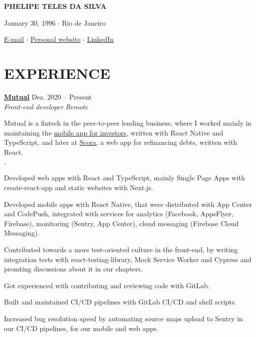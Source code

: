 \documentclass[12pt]{article}
\newenvironment{tightlist}
  {\begin{list}
    {$\cdot$}
    {
      \setlength{\leftmargin}{0em}
      \setlength{\itemsep}{\smallskipamount}
    }
  }
{\end{list}}
\begin{document}
\pagestyle{empty}

\centerline{\huge\bf PHELIPE TELES DA SILVA}
\medskip

\centerline{January 30, 1996 $\cdot$ Rio de Janeiro}
\smallskip

\centerline{
  \href{mailto:telesphelipe@gmail.com}{E-mail}
  $\cdot$
  \href{https://phelipetls.github.io}{Personal website}
  $\cdot$
  \href{https://linkedin.com/in/phelipeteles}{LinkedIn}
}
\smallskip

\section*{EXPERIENCE}

\textbf{\href{https://mutual.club}{Mutual}} \hfill Dez. 2020 -- Present \\
\textit{Front-end developer} \hfill \textit{Remote} {\parfillskip=0pt\par}

Mutual is a fintech in the peer-to-peer lending business, where I worked mainly
in maintaining the \href{https://mutual.club/en/invest.html}{mobile app for
investors}, written with React Native and TypeScript, and later at
\href{https://scora.com.br/}{Scora}, a web app for refinancing debts, written
with React.

\medskip

\begin{tightlist}
  \item Developed web apps with React and TypeScript, mainly Single Page Apps
    with create-react-app and static websites with Next.js.
  \item Developed mobile apps with React Native, that were distributed with App
    Center and CodePush, integrated with services for analytics (Facebook,
    AppsFlyer, Firebase), monitoring (Sentry, App Center), cloud messaging
    (Firebase Cloud Messaging).
  \item Contributed towards a more test-oriented culture in the front-end, by
    writing integration tests with react-testing-library, Mock Service Worker
    and Cypress and promting discussions about it in our chapters.
  \item Got experienced with contributing and reviewing code with GitLab.
  \item Built and maintained CI/CD pipelines with GitLab CI/CD and shell
    scripts.
  \item Increased bug resolution speed by automating source maps upload to
    Sentry in our CI/CD pipelines, for our mobile and web apps.
\end{tightlist}
\end{document}
